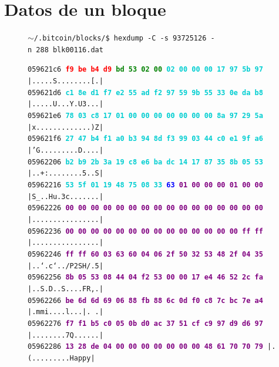 \documentclass{article}
\begin{document}
\section{Datos de un bloque}
\begin{figure}[H]
\scriptsize{\texttt{$\sim$/.bitcoin/blocks/\$ hexdump\ -C\ -s\ 93725126\ -n\ 288\ blk00116.dat}}
    
    \scriptsize{
    \texttt{059621c6  \textbf{\textcolor{red}{f9 be b4 d9} \textcolor{green}{bd 53 02 00}  \textcolor{darkTurquoise}{02 00 00 00 17 97 5b 97}}  |.....S........[.|} \\
    \texttt{059621d6  \textbf{\textcolor{darkTurquoise}{c1 8e d1 f7 e2 55 ad f2  97 59 9b 55 33 0e da b8}}  |.....U...Y.U3...|} \\
    \texttt{059621e6  \textbf{\textcolor{darkTurquoise}{78 03 c8 17 01 00 00 00  00 00 00 00 8a 97 29 5a}}  |x.............)Z|} \\
    \texttt{059621f6  \textbf{\textcolor{darkTurquoise}{27 47 b4 f1 a0 b3 94 8d  f3 99 03 44 c0 e1 9f a6}}  |'G.........D....|} \\
    \texttt{05962206  \textbf{\textcolor{darkTurquoise}{b2 b9 2b 3a 19 c8 e6 ba  dc 14 17 87 35 8b 05 53}}  |..+:........5..S|} \\
    \texttt{05962216  \textbf{\textcolor{darkTurquoise}{53 5f 01 19 48 75 08 33}  \textcolor{blue}{63} \textcolor{purple}{01 00 00 00 01 00 00}}  |S\_..Hu.3c.......|} \\
    \texttt{05962226 \textbf{\textcolor{purple}{00 00 00 00 00 00 00 00  00 00 00 00 00 00 00 00}} |................|} \\
    \texttt{05962236 \textbf{\textcolor{purple}{00 00 00 00 00 00 00 00  00 00 00 00 00 00 ff ff}} |................|} \\
    \texttt{05962246 \textbf{\textcolor{purple}{ff ff 60 03 63 60 04 06  2f 50 32 53 48 2f 04 35}} |..`.c`../P2SH/.5|} \\
    \texttt{05962256 \textbf{\textcolor{purple}{8b 05 53 08 44 04 f2 53  00 00 17 e4 46 52 2c fa}} |..S.D..S....FR,.|} \\
    \texttt{05962266 \textbf{\textcolor{purple}{be 6d 6d 69 06 88 fb 88  6c 0d f0 c8 7c bc 7e a4}} |.mmi....l...|.~.|} \\
    \texttt{05962276 \textbf{\textcolor{purple}{f7 f1 b5 c0 05 0b d0 ac  37 51 cf c9 97 d9 d6 97}} |........7Q......|} \\
    \texttt{05962286 \textbf{\textcolor{purple}{13 28 de 04 00 00 00 00  00 00 00 48 61 70 70 79}} |.(.........Happy|} \\
}
\end{figure}
\end{document}
